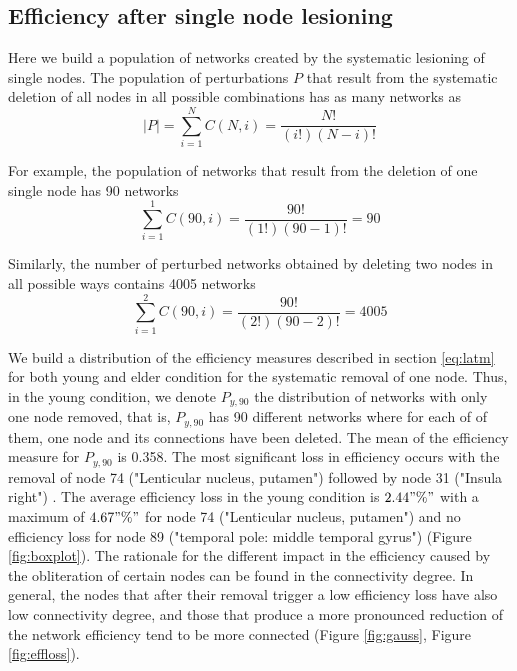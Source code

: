 \documentclass[12pt,a4paper]{article}
\begin{document}
\subsection{Efficiency after single node lesioning}
\label{ss:single}
Here we build a population of networks created by the systematic lesioning of single nodes. 
The population of perturbations $P$ that result from the systematic deletion of all nodes in all possible combinations has as many networks as  
\begin{equation*}
|P| = \sum_{i=1}^{N} C(N,i) = \frac{N!} {(i!)(N-i)!}
\label{eq:perurb}
\end{equation*}

For example, the population of networks that result from the deletion of one single node has 90 networks 
\begin{equation*}
\sum_{i=1}^{1}
C(90,i) = \frac{90!} {(1!)(90-1)!} = 90
\end{equation*}

Similarly, the number of perturbed networks obtained by deleting two nodes in all possible ways contains 4005 networks
\begin{equation*}
\sum_{i=1}^{2} C(90,i)=
 \frac{90!} {(2!)(90-2)!} = 4005
\end{equation*}

We build a distribution of the efficiency measures described in section \ref{eq:latm}
for both young and elder condition for the systematic removal of one node. Thus, in the young condition, we denote $P_{y, 90}$ the distribution of networks with only one node removed, that is, $P_{y, 90}$ has 90 different networks where for each of of them, one node and its connections have been deleted. 
The mean of the efficiency measure for $P_{y, 90}$ is 0.358. 
The most significant loss in efficiency occurs with the removal of node 74 ("Lenticular nucleus, putamen") followed by node 31 ("Insula right") . 
The average efficiency loss in the young condition is $2.44"\%" $ with a maximum of  $4.67"\%" $ for node 74 ("Lenticular nucleus, putamen") and no efficiency loss for node 89 ("temporal pole: middle temporal gyrus") (Figure \ref{fig:boxplot}). The rationale for the different impact in the efficiency caused by the obliteration of certain nodes can be found in the connectivity degree. In general, the nodes that after their removal trigger a low efficiency loss have also low connectivity degree, and those that produce a more pronounced reduction of the network efficiency tend to be more connected (Figure \ref{fig:gauss}, Figure \ref{fig:effloss}). 
\end{document}
